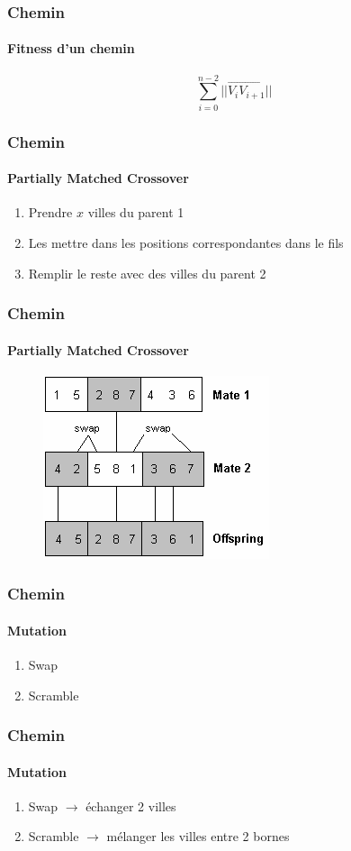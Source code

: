 \documentclass[16pt]{beamer}
\begin{document}
\begin{frame}
  \frametitle{Chemin}
  \framesubtitle{Fitness d'un chemin}
  \[
    \sum_{i = 0}^{n-2} ||\overrightarrow{V_{i}V_{i+1}}||
  \]
\end{frame}

\begin{frame}
  \frametitle{Chemin}
  \framesubtitle{Partially Matched Crossover}
    \begin{enumerate}
      \item Prendre $x$ villes du parent 1
      \item Les mettre dans les positions correspondantes dans le fils
      \item Remplir le reste avec des villes du parent 2
    \end{enumerate}
\end{frame}

\begin{frame}
  \frametitle{Chemin}
  \framesubtitle{Partially Matched Crossover}
  \begin{figure}
    \includegraphics[scale=0.9]{pmx.png}
    \end{figure}
\end{frame}

\begin{frame}
  \frametitle{Chemin}
  \framesubtitle{Mutation}
  \begin{enumerate}
    \item Swap
    \item Scramble
  \end{enumerate}
\end{frame}

\begin{frame}
  \frametitle{Chemin}
  \framesubtitle{Mutation}
  \begin{enumerate}
    \item Swap $\rightarrow$ échanger 2 villes
    \item Scramble $\rightarrow$ mélanger les villes entre 2 bornes
  \end{enumerate}
\end{frame}
\end{document}
